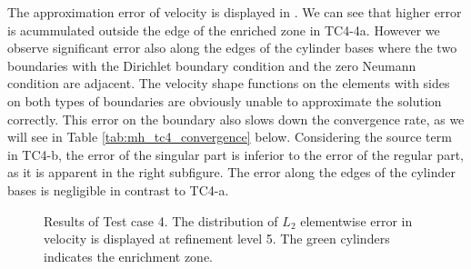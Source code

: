 The approximation error of velocity is displayed in . We can see that higher
error is acummulated outside the edge of the enriched zone in TC4-4a. However we observe significant error also
along the edges of the cylinder bases where the two boundaries with the Dirichlet boundary condition and the zero Neumann condition
are adjacent. The velocity shape functions on the elements with sides on both types of boundaries are obviously unable to approximate
the solution correctly. This error on the boundary also slows down the convergence rate, as we will see in Table \ref{tab:mh_tc4_convergence} below.
Considering the source term in TC4-b, the error of the singular part is inferior to the error of the regular part, as it is apparent
in the right subfigure. The error along the edges of the cylinder bases is negligible in contrast to TC4-a.
%
\begin{figure}[!htb]
    \centering
    \caption
    {Results of Test case 4. The distribution of $L_2$ elementwise error in velocity is displayed at refinement level 5.
    The green cylinders indicates the enrichment zone. }
    \label{fig:mh_tc4_error}
\end{figure}
%
